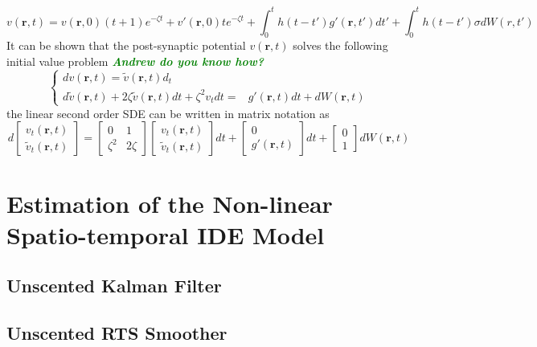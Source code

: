 \documentclass[a4paper,10pt]{article}
\newcommand{\parham}[1]{\textsf{\emph{\textbf{\textcolor{green}{#1}}}}}
\begin{document}
\begin{equation}\label{eq:SecondOrderNeuralModelDeterStoch}
v\left( {\mathbf{r},t} \right)=v(\mathbf r, 0)(t+1)e^{-\zeta t}+v'(\mathbf r,0)te^{-\zeta t}+\int_0^t {h\left( {t - t'} \right)g'\left( {\mathbf{r},t'} \right)dt'}+ \int_0^t h\left( {t - t'} \right)\sigma d W(r,t')
\end{equation}
It can be shown that the post-synaptic potential $v(\mathbf r, t)$ solves the following initial value problem \parham{Andrew do you know how?}
\begin{equation*}
\left\lbrace \begin{array}{lc}
dv(\mathbf r,t)=\tilde{v}(\mathbf r,t)d_t & \\
d\tilde{v}(\mathbf r,t)+2\zeta\tilde{v}(\mathbf r,t)dt+\zeta^2v_tdt=&g'(\mathbf r,t)dt+dW(\mathbf r,t)
\end{array}\right.
\end{equation*}
the linear second order SDE can be written in matrix notation as
\begin{equation}
 d\begin{bmatrix} v_t(\mathbf r ,t) \\ \tilde{v}_t(\mathbf r ,t)\end{bmatrix}=\begin{bmatrix}0 & 1 \\ \zeta^2 & 2\zeta \end{bmatrix}\begin{bmatrix} v_t(\mathbf r ,t) \\ \tilde{v}_t(\mathbf r ,t)\end{bmatrix}dt+\begin{bmatrix}0 \\ g'(\mathbf r, t)\end{bmatrix}dt+\begin{bmatrix}0 \\ 1 \end{bmatrix}dW(\mathbf r,t)
\end{equation}


\section{Estimation of the Non-linear Spatio-temporal IDE Model}

\subsection{Unscented Kalman Filter}
\subsection{Unscented RTS Smoother}
\end{document}
